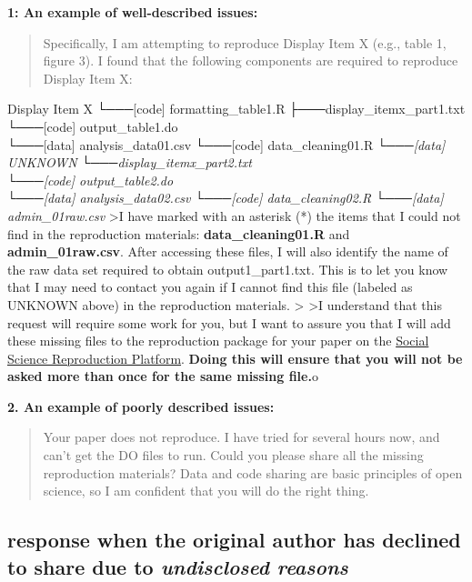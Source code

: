 \documentclass[
]{book}
\begin{document}
\textbf{1: An example of well-described issues:}

\begin{quote}
Specifically, I am attempting to reproduce Display Item X (e.g., table 1, figure 3). I found that the following components are required to reproduce Display Item X:
\end{quote}

Display Item X
└───{[}code{]} formatting\_table1.R
├───display\_itemx\_part1.txt\\
\textbar{} └───{[}code{]} output\_table1.do\\
\textbar{} └───{[}data{]} analysis\_data01.csv
\textbar{} └───{[}code{]} data\_cleaning01.R\emph{
\textbar{} └───{[}data{]} UNKNOWN
└───display\_itemx\_part2.txt\\
└───{[}code{]} output\_table2.do\\
└───{[}data{]} analysis\_data02.csv
└───{[}code{]} data\_cleaning02.R
└───{[}data{]} admin\_01raw.csv}
\textgreater I have marked with an asterisk (*) the items that I could not find in the reproduction materials: \textbf{data\_cleaning01.R} and \textbf{admin\_01raw.csv}. After accessing these files, I will also identify the name of the raw data set required to obtain output1\_part1.txt. This is to let you know that I may need to contact you again if I cannot find this file (labeled as UNKNOWN above) in the reproduction materials.
\textgreater{}
\textgreater I understand that this request will require some work for you, but I want to assure you that I will add these missing files to the reproduction package for your paper on the \href{https://www.socialsciencereproduction.org/}{Social Science Reproduction Platform}. \textbf{Doing this will ensure that you will not be asked more than once for the same missing file.}o

\textbf{2. An example of poorly described issues:}

\begin{quote}
Your paper does not reproduce. I have tried for several hours now, and can't get the DO files to run. Could you please share all the missing reproduction materials? Data and code sharing are basic principles of open science, so I am confident that you will do the right thing.
\end{quote}

\hypertarget{response-when-the-original-author-has-declined-to-share-due-to-undisclosed-reasons}{%
\subsection{\texorpdfstring{response when the original author has declined to share due to \emph{undisclosed reasons}}{response when the original author has declined to share due to undisclosed reasons}}\label{response-when-the-original-author-has-declined-to-share-due-to-undisclosed-reasons}}
\end{document}
